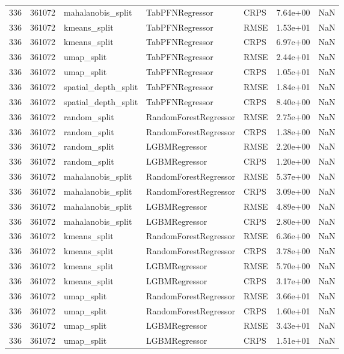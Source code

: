 \begin{tabular}{rrlllrr}
336 & 361072 & mahalanobis\_split & TabPFNRegressor & CRPS & 7.64e+00 & NaN \\
336 & 361072 & kmeans\_split & TabPFNRegressor & RMSE & 1.53e+01 & NaN \\
336 & 361072 & kmeans\_split & TabPFNRegressor & CRPS & 6.97e+00 & NaN \\
336 & 361072 & umap\_split & TabPFNRegressor & RMSE & 2.44e+01 & NaN \\
336 & 361072 & umap\_split & TabPFNRegressor & CRPS & 1.05e+01 & NaN \\
336 & 361072 & spatial\_depth\_split & TabPFNRegressor & RMSE & 1.84e+01 & NaN \\
336 & 361072 & spatial\_depth\_split & TabPFNRegressor & CRPS & 8.40e+00 & NaN \\
336 & 361072 & random\_split & RandomForestRegressor & RMSE & 2.75e+00 & NaN \\
336 & 361072 & random\_split & RandomForestRegressor & CRPS & 1.38e+00 & NaN \\
336 & 361072 & random\_split & LGBMRegressor & RMSE & 2.20e+00 & NaN \\
336 & 361072 & random\_split & LGBMRegressor & CRPS & 1.20e+00 & NaN \\
336 & 361072 & mahalanobis\_split & RandomForestRegressor & RMSE & 5.37e+00 & NaN \\
336 & 361072 & mahalanobis\_split & RandomForestRegressor & CRPS & 3.09e+00 & NaN \\
336 & 361072 & mahalanobis\_split & LGBMRegressor & RMSE & 4.89e+00 & NaN \\
336 & 361072 & mahalanobis\_split & LGBMRegressor & CRPS & 2.80e+00 & NaN \\
336 & 361072 & kmeans\_split & RandomForestRegressor & RMSE & 6.36e+00 & NaN \\
336 & 361072 & kmeans\_split & RandomForestRegressor & CRPS & 3.78e+00 & NaN \\
336 & 361072 & kmeans\_split & LGBMRegressor & RMSE & 5.70e+00 & NaN \\
336 & 361072 & kmeans\_split & LGBMRegressor & CRPS & 3.17e+00 & NaN \\
336 & 361072 & umap\_split & RandomForestRegressor & RMSE & 3.66e+01 & NaN \\
336 & 361072 & umap\_split & RandomForestRegressor & CRPS & 1.60e+01 & NaN \\
336 & 361072 & umap\_split & LGBMRegressor & RMSE & 3.43e+01 & NaN \\
336 & 361072 & umap\_split & LGBMRegressor & CRPS & 1.51e+01 & NaN \\

\end{tabular}
